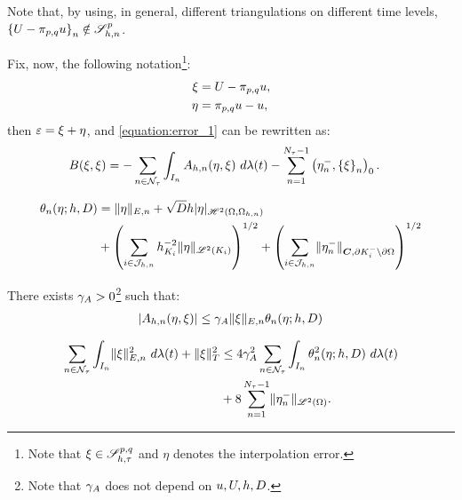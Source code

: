 Note that, by using, in general, different triangulations on different time levels, $\left\{ U - \pi_{p, q} u \right\}_n \notin \mathscr{S}^p_{h, n}$.

Fix, now, the following notation\footnote{Note that $\xi \in \mathscr{S}^{p, q}_{h, \tau}$ and $\eta$ denotes the interpolation error.}:
\begin{align}
    \xi &= U - \pi_{p, q} u, \\
    \eta &= \pi_{p, q} u - u,
\end{align}
then $\varepsilon = \xi + \eta$, and \cref{equation:error_1} can be rewritten as:
\begin{align}
    B(\xi, \xi) &= - \sum_{n \in \mathcal{N}_{\tau}} \int_{I_n} A_{h, n}(\eta, \xi) ~ d \lambda(t) - \sum_{n = 1}^{N_{\tau} - 1} \left( \eta_n^-, \left\{ \xi \right\}_n \right)_0. \label{equation:error_2}
\end{align}

\begin{definition}
    \begin{align} %
        \theta_n(\eta; h, \Diffusion) &= \lVert \eta \rVert_{E, n} + \sqrt{\Diffusion} h \lvert \eta \rvert_{\SpaceHk{2}(\Omega, \Omega_{h, n})} \\
        &+ \left( \sum_{i \in \SpaceTimeIndices} h_{K_i}^{-2} \lVert \eta \rVert_{\SpaceLp{2}(K_i)} \right)^{1/2} + \left( \sum_{i \in \SpaceTimeIndices} \lVert \eta_n^- \rVert_{\Convection, \partial K_i^- \setminus \partial \Omega} \right)^{1/2}
    \end{align}
\end{definition}

\begin{lemma}
    There exists $\gamma_{A} > 0$\footnote{Note that $\gamma_{A}$ does not depend on $u, U, h, D$.} such that:
    \begin{align}
        \lvert A_{h, n}(\eta, \xi) \rvert \leq \gamma_{A} \lVert \xi \rVert_{E, n} \theta_n(\eta; h, D)
    \end{align}
\end{lemma}

\begin{lemma}
    \begin{align}
        \sum_{n \in \mathcal{N}_{\tau}} \int_{I_n} \lVert \xi \rVert_{E, n}^2 ~ d \lambda(t) + \lVert \xi \rVert_T^2 &\leq 4 \gamma_{A}^2 \sum_{n \in \mathcal{N}_{\tau}} \int_{I_n} \theta_n^2(\eta; h, D) ~ d \lambda(t) \\
        &+ 8 \sum_{n = 1}^{N_{\tau} - 1} \lVert \eta_n^- \rVert_{\mathscr{L}^{2}(\Omega)}. \notag
    \end{align}
\end{lemma}

